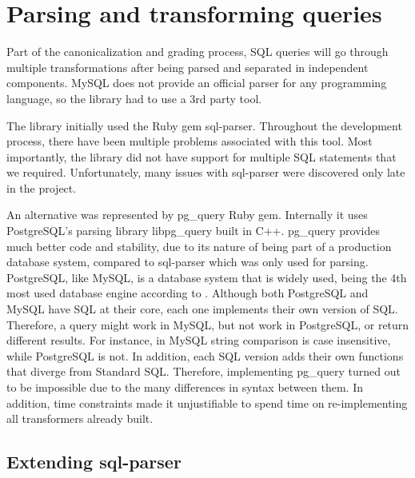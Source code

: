 \section{Parsing and transforming queries}

Part of the canonicalization and grading process, SQL queries will go through multiple transformations after being parsed and separated in independent components. MySQL does not provide an official parser for any programming language, so the library had to use a 3rd party tool.

The library initially used the Ruby gem sql-parser. Throughout the development process, there have been multiple problems associated with this tool. Most importantly, the library did not have support for multiple SQL statements that we required. Unfortunately, many issues with sql-parser were discovered only late in the project.

An alternative was represented by pg\_query Ruby gem. Internally it uses PostgreSQL's parsing library libpg\_query built in C++. pg\_query provides much better code and stability, due to its nature of being part of a production database system, compared to sql-parser which was only used for parsing. PostgreSQL, like MySQL, is a database system that is widely used, being the 4th most used database engine according to \cite{db_engine:statistics}. Although both PostgreSQL and MySQL have SQL at their core, each one implements their own version of SQL. Therefore, a query might work in MySQL, but not work in PostgreSQL, or return different results. For instance, in MySQL string comparison is case insensitive, while PostgreSQL is not. In addition, each SQL version adds their own functions that diverge from Standard SQL. Therefore, implementing pg\_query turned out to be impossible due to the many differences in syntax between them. In addition, time constraints made it unjustifiable to spend time on re-implementing all transformers already built.

\subsection{Extending sql-parser}

